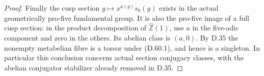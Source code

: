 \begin{proof}
Finally the cusp section \(g\mapsto x^{a(g)}s_0(g)\)
exists in the actual geometrically pro-five fundamental
group. It is also the pro-five image of a full cusp section:
in the product decomposition of \(\widehat{\mathbb Z}(1)\),
use \(a\) in the five-adic component and zero in the others.
Its abelian class is \((a,0)\). By D.35 the nonempty
metabelian fibre is a torsor under (D.60.1), and hence is
a singleton. In particular this conclusion concerns actual
section conjugacy classes, with the abelian conjugator
stabilizer already removed in D.35.
\end{proof}
